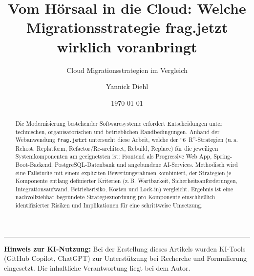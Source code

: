 \documentclass[%
   final,%
   paper=a4,%
   pagesize=auto,%
   fontsize=10pt,%
   twocolumn,%
   version=last,%
   parskip=half%
]{scrartcl}
\author{Yannick Diehl}
\title{Vom Hörsaal in die Cloud: Welche Migrationsstrategie frag.jetzt wirklich voranbringt}
\subtitle{Cloud Migrationsstrategien im Vergleich}
\date{\today}
\begin{document}
\maketitle

\begin{abstract}
\noindent
Die Modernisierung bestehender Softwaresysteme erfordert Entscheidungen unter technischen, organisatorischen und betrieblichen Randbedingungen. Anhand der Webanwendung \texttt{frag.jetzt} untersucht diese Arbeit, welche der \enquote{6~R}-Strategien (u.\,a. Rehost, Replatform, Refactor/Re-architect, Rebuild, Replace) für die jeweiligen Systemkomponenten am geeignetsten ist: Frontend als Progressive Web App, Spring-Boot-Backend, PostgreSQL-Datenbank und angebundene AI-Services. Methodisch wird eine Fallstudie mit einem expliziten Bewertungsrahmen kombiniert, der Strategien je Komponente entlang definierter Kriterien (z.\,B. Wartbarkeit, Sicherheitsanforderungen, Integrationsaufwand, Betriebsrisiko, Kosten und Lock-in) vergleicht. Ergebnis ist eine nachvollziehbar begründete Strategiezuordnung pro Komponente einschließlich identifizierter Risiken und Implikationen für eine schrittweise Umsetzung.
\end{abstract}



\printbibliography[title=Quellen und weiterführende Literatur]

\vspace{1em}
\noindent\rule{\columnwidth}{0.4pt}
{\footnotesize\textbf{Hinweis zur KI-Nutzung:} Bei der Erstellung dieses Artikels wurden KI-Tools (GitHub Copilot, ChatGPT) zur Unterstützung bei Recherche und Formulierung eingesetzt. Die inhaltliche Verantwortung liegt bei dem Autor.}
\end{document}
